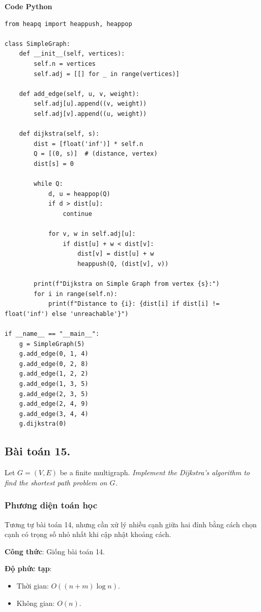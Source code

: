 \documentclass[a4paper,12pt]{article}
\begin{document}
\textbf{Code Python}
\lstset{language=Python}
\begin{lstlisting}
from heapq import heappush, heappop

class SimpleGraph:
    def __init__(self, vertices):
        self.n = vertices
        self.adj = [[] for _ in range(vertices)]

    def add_edge(self, u, v, weight):
        self.adj[u].append((v, weight))
        self.adj[v].append((u, weight))

    def dijkstra(self, s):
        dist = [float('inf')] * self.n
        Q = [(0, s)]  # (distance, vertex)
        dist[s] = 0

        while Q:
            d, u = heappop(Q)
            if d > dist[u]:
                continue

            for v, w in self.adj[u]:
                if dist[u] + w < dist[v]:
                    dist[v] = dist[u] + w
                    heappush(Q, (dist[v], v))

        print(f"Dijkstra on Simple Graph from vertex {s}:")
        for i in range(self.n):
            print(f"Distance to {i}: {dist[i] if dist[i] != float('inf') else 'unreachable'}")

if __name__ == "__main__":
    g = SimpleGraph(5)
    g.add_edge(0, 1, 4)
    g.add_edge(0, 2, 8)
    g.add_edge(1, 2, 2)
    g.add_edge(1, 3, 5)
    g.add_edge(2, 3, 5)
    g.add_edge(2, 4, 9)
    g.add_edge(3, 4, 4)
    g.dijkstra(0)
\end{lstlisting}

\subsection{Bài toán 15.} Let $G = (V, E)$ be a finite multigraph. \textit{Implement the Dijkstra’s algorithm to find the shortest path problem on $G$.}

\subsubsection{Phương diện toán học}
Tương tự bài toán 14, nhưng cần xử lý nhiều cạnh giữa hai đỉnh bằng cách chọn cạnh có trọng số nhỏ nhất khi cập nhật khoảng cách.

\textbf{Công thức}: Giống bài toán 14.

\textbf{Độ phức tạp}:
\begin{itemize}
    \item Thời gian: \( O((n + m) \log n) \).
    \item Không gian: \( O(n) \).
\end{itemize}
\end{document}
